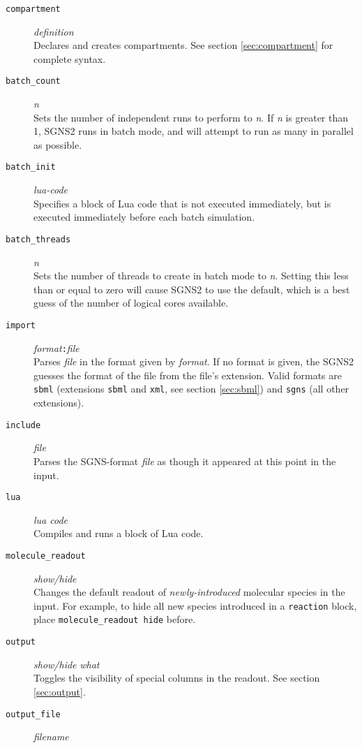 \documentclass[10pt]{article}
\newcommand{\code}[1]{{\tt {#1}}}
\newcommand{\codeparam}[1]{\textrm{\textit{#1}}}
\newcommand{\programname}{SGNS2}
\begin{document}
\begin{description}
\item[\code{compartment}] \codeparam{definition} \\
	Declares and creates compartments. See section \ref{sec:compartment} for complete syntax.
\item[\code{batch\_count}] \codeparam{n} \\
	Sets the number of independent runs to perform to \codeparam{n}. If \codeparam{n} is greater than 1, {\programname} runs in batch mode, and will attempt to run as many in parallel as possible.
\item[\code{batch\_init}] \codeparam{lua-code} \\
	Specifies a block of Lua code that is not executed immediately, but is executed immediately before each batch simulation.
\item[\code{batch\_threads}] \codeparam{n} \\
	Sets the number of threads to create in batch mode to \codeparam{n}. Setting this less than or equal to zero will cause {\programname} to use the default, which is a best guess of the number of logical cores available.
\item[\code{import}] \codeparam{format}\code{:}\codeparam{file} \\
	Parses \codeparam{file} in the format given by \codeparam{format}. If no format is given, the SGNS2 guesses the format of the file from the file's extension. Valid formats are \code{sbml} (extensions \code{sbml} and \code{xml}, see section \ref{sec:sbml}) and \code{sgns} (all other extensions).
\item[\code{include}] \codeparam{file} \\
	Parses the SGNS-format \codeparam{file} as though it appeared at this point in the input.
\item[\code{lua}] \codeparam{lua code} \\
	Compiles and runs a block of Lua code.
\item[\code{molecule\_readout}] \codeparam{show/hide} \\
	Changes the default readout of \emph{newly-introduced} molecular species in the input. For example, to hide all new species introduced in a \code{reaction} block, place \code{molecule\_readout hide} before.
\item[\code{output}] \codeparam{show/hide} \codeparam{what} \\
	Toggles the visibility of special columns in the readout. See section \ref{sec:output}.
\item[\code{output\_file}] \codeparam{filename} \\

\end{description}
\end{document}
